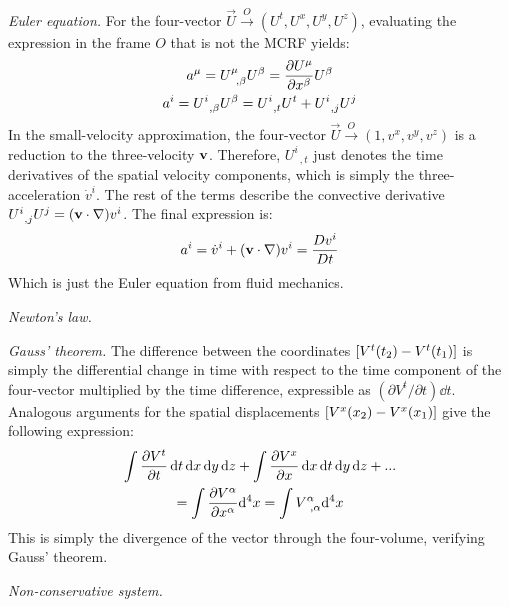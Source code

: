 \documentclass{report}
\begin{document}
\begin{subquests}
	\item \emph{Euler equation.}
	For the four-vector $\vec U \stackrel{O}\longrightarrow (U^t, U^x, U^y, U^z)$, evaluating the expression in the frame $O$ that is not the MCRF yields:
	\begin{gather*}
		a^{\mu} = U^{\mu}_{\;\;,\beta}U^{\beta} = \pdv{U^{\mu}}{x^{\beta}}U^{\beta} \\
		a^{i} = U^{i}_{\;\;,\beta}U^{\beta} = U^{i}_{\;\;,t}U^t + U^i_{\;\;,j}U^{j}
	\end{gather*}
	In the small-velocity approximation, the four-vector $\vec U \stackrel{O}\longrightarrow (1,v^x,v^y,v^z)$ is a reduction to the three-velocity ${\vb v}$. Therefore, $U^i_{\;\;,t}$ just denotes the time derivatives of the spatial velocity components, which is simply the three-acceleration $\dot{v}^i$. The rest of the terms describe the convective derivative $U^i_{\;\;,j}U^{j} = \pqty{{\vb v \cdot \nabla}}v^i$. The final expression is:
	\begin{gather*}
		a^i = \dot{v}^i + \pqty{{\vb v \cdot \nabla}}v^i = \frac{Dv^i}{Dt}
	\end{gather*}
	Which is just the Euler equation from fluid mechanics.

	\item \emph{Newton's law.}

	\item \emph{Gauss' theorem.}
	The difference between the coordinates $\bqty{V^t(t_2) - V^t(t_1)}$ is simply the differential change in time with respect to the time component of the four-vector multiplied by the time difference, expressible as $(\partial V^t/\partial t)\dd{t}$. Analogous arguments for the spatial displacements $\bqty{V^x(x_2) - V^x(x_1)}$ give the following expression:
	\begin{gather*}
		\int \pdv{V^t}{t} \dd{t}\dd{x}\dd{y}\dd{z} + \int \pdv{V^x}{x}\dd{x}\dd{t}\dd{y}\dd{z} + ... \\
		= \int \pdv{V^{\alpha}}{x^{\alpha}} \dd^4{x} = \int V^{\alpha}_{\;\;,\alpha} \dd^4{x}
	\end{gather*}
	This is simply the divergence of the vector through the four-volume, verifying Gauss' theorem.

	\item \emph{Non-conservative system.}
	\begin{subquests}
		\item

		\item
	\end{subquests}


\end{subquests}
\end{document}
